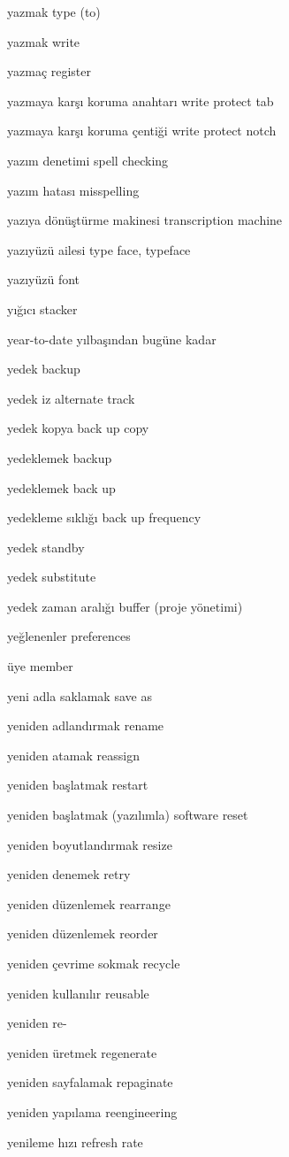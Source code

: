 \documentclass[12pt,fleqn]{article}\usepackage{../../common}
\begin{document}
yazmak type (to)

yazmak write

yazmaç register

yazmaya karşı koruma anahtarı write protect tab

yazmaya karşı koruma çentiği write protect notch

yazım denetimi spell checking

yazım hatası misspelling

yazıya dönüştürme makinesi transcription machine

yazıyüzü ailesi type face, typeface

yazıyüzü font

yığıcı stacker

year-to-date yılbaşından bugüne kadar

yedek backup

yedek iz alternate track

yedek kopya back up copy

yedeklemek backup

yedeklemek back up

yedekleme sıklığı back up frequency

yedek standby

yedek substitute

yedek zaman aralığı buffer (proje yönetimi)

yeğlenenler preferences

üye member

yeni adla saklamak save as

yeniden adlandırmak rename

yeniden atamak reassign

yeniden başlatmak restart

yeniden başlatmak (yazılımla) software reset

yeniden boyutlandırmak resize

yeniden denemek retry

yeniden düzenlemek rearrange

yeniden düzenlemek reorder

yeniden çevrime sokmak recycle

yeniden kullanılır reusable

yeniden re-

yeniden üretmek regenerate

yeniden sayfalamak repaginate

yeniden yapılama reengineering

yenileme hızı refresh rate
\end{document}
